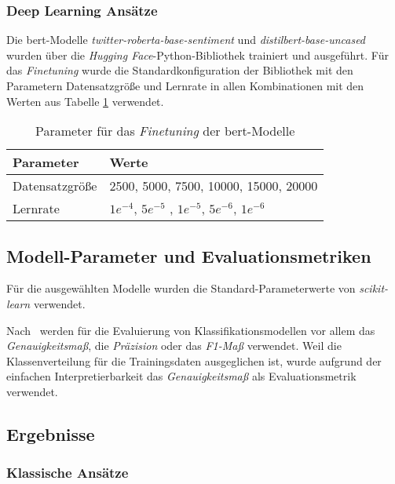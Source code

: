 \subsubsection{Deep Learning Ansätze} \label{sec:deep-learning-ansaetze}
Die \gls{bert}-Modelle \textit{twitter-roberta-base-sentiment} und \textit{distilbert-base-uncased} wurden über die \textit{Hugging Face}-Python-Bibliothek trainiert und ausgeführt. Für das \textit{Finetuning} wurde die Standardkonfiguration der Bibliothek mit den Parametern Datensatzgröße und Lernrate in allen Kombinationen mit den Werten aus Tabelle \ref{tab:dl-params} verwendet.
\begin{table}
    \begin{tabular}{ll}
        \toprule
        Parameter       & Werte                                                   \\
        \midrule
        Datensatzgröße  & 2500, 5000, 7500, 10000, 15000, 20000                   \\
        Lernrate        & $1e^{-4}$, $5e^{-5}$ , $1e^{-5}$, $5e^{-6}$, $1e^{-6}$  \\
        \bottomrule
    \end{tabular}
    \caption{
        Parameter für das \textit{Finetuning} der \gls{bert}-Modelle
    }
    \label{tab:dl-params}
\end{table}
\subsection{Modell-Parameter und Evaluationsmetriken}

Für die ausgewählten Modelle wurden die Standard-Parameterwerte von \textit{scikit-learn} verwendet.

Nach~\cite{wankhade2022survey} werden für die Evaluierung von Klassifikationsmodellen vor allem das \textit{Genauig\-keits\-maß}, die \textit{Präzision} oder das \textit{F1-Maß} verwendet.
Weil die Klassenverteilung für die Trainingsdaten ausgeglichen ist, wurde aufgrund der einfachen Interpretierbarkeit das \textit{Genauigkeitsmaß} als Evaluationsmetrik verwendet.

\subsection{Ergebnisse}

\subsubsection{Klassische Ansätze}

